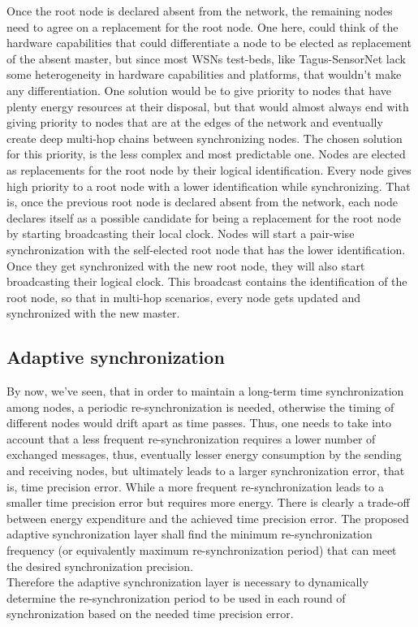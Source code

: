 Once the root node is declared absent from the network, the remaining nodes need to agree on a replacement for the root node. One here, could think of the hardware capabilities that could differentiate a node to be elected as replacement of the absent master, but since most WSNs test-beds, like Tagus-SensorNet lack some heterogeneity in hardware capabilities and platforms, that wouldn't make any differentiation. One solution would be to give priority to nodes that have plenty energy resources at their disposal, but that would almost always end with giving priority to nodes that are at the edges of the network and eventually create deep multi-hop chains between synchronizing nodes. The chosen solution for this priority, is the less complex and most predictable one. Nodes are elected as replacements for the root node by their logical identification. Every node gives high priority to a root node with a lower identification while synchronizing. That is, once the previous root node is declared absent from the network, each node declares itself as a possible candidate for being a replacement for the root node by starting broadcasting their local clock. Nodes will start a pair-wise synchronization with the self-elected root node that has the lower identification. Once they get synchronized with the new root node, they will also start broadcasting their logical clock. This broadcast contains the identification of the root node, so that in multi-hop scenarios, every node gets updated and synchronized with the new master.


\subsection{Adaptive synchronization}
By now, we've seen, that in order to maintain a long-term time synchronization among nodes, a periodic re-synchronization is needed, otherwise the timing of different nodes would drift apart as time passes. Thus, one needs to take into account that a less frequent re-synchronization requires a lower number of exchanged messages, thus, eventually lesser energy consumption by the sending and receiving nodes, but ultimately leads to a larger synchronization error, that is, time precision error. While a more frequent re-synchronization leads to a smaller time precision error but requires more energy. There is clearly a trade-off between energy expenditure and the achieved time precision error. The proposed adaptive synchronization layer shall find the minimum re-synchronization frequency (or equivalently maximum re-synchronization period) that can meet the desired  synchronization precision.\\
Therefore the adaptive synchronization layer is necessary to dynamically determine the re-synchronization period to be used in each round of synchronization based on the needed time precision error.

